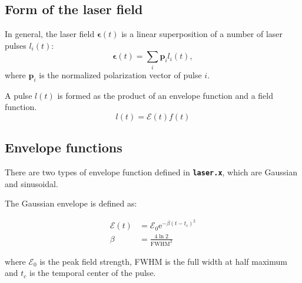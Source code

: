 \documentclass[a4paper,11pt,DIV=15,openany,twoside=false]{scrbook}
\newcommand{\ttmdump}[1]{#1}
\newcommand{\ttt}[1]{\textbf{\texttt{#1}}}
\newcommand{\E}{\ensuremath{\mathrm{e}}}
\newcommand{\VEC}[1]{\ensuremath{\mathbf{#1}}}
\begin{document}
\subsection{Form of the laser field}

In general, the laser field $\boldsymbol{\epsilon}(t)$ is a linear superposition of a number of laser pulses $l_i(t)$:
\begin{equation}
  \boldsymbol{\epsilon}(t)=\sum\limits_i \VEC{p}_il_i(t),
\end{equation}
where $\VEC{p}_i$ is the normalized polarization vector of pulse $i$.

A pulse $l(t)$ is formed as the product of an envelope function and a field function. 
\begin{equation}
  l(t)=\mathcal{E}(t)f(t)
\end{equation}

\subsection{Envelope functions}

There are two types of envelope function defined in \ttt{laser.x}, which are Gaussian and sinusoidal.

The Gaussian envelope is defined as:
\ttmdump{
  \begin{align}
    \mathcal{E}(t)&=\mathcal{E}_0 \E^{-\beta(t-t_c)^2}\label{eq:laser_gauss_1}\\
    \beta&=\frac{4\ln 2}{\mathrm{FWHM}^2}\label{eq:laser_gauss_2}
  \end{align}
}
where $\mathcal{E}_0$ is the peak field strength, FWHM is the full width at half maximum and $t_c$ is the temporal center of the pulse.
\end{document}
